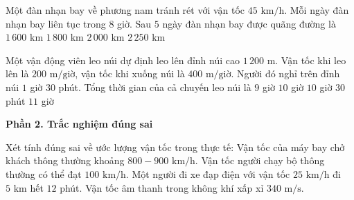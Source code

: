 \begin{ex} %
Một đàn nhạn bay về phương nam tránh rét với vận tốc $45\text{ km/h}$. Mỗi ngày đàn nhạn bay liên tục trong $8$ giờ. Sau $5$ ngày đàn nhạn bay được quãng đường là
\choice
{$1\,600\text{ km}$}
{\True $1\,800\text{ km}$}
{$2\,000\text{ km}$}
{$2\,250\text{ km}$}
\end{ex}

\begin{ex} %
Một vận động viên leo núi dự định leo lên đỉnh núi cao $1\,200\text{ m}$. Vận tốc khi leo lên là $200\text{ m/giờ}$, vận tốc khi xuống núi là $400\text{ m/giờ}$. Người đó nghỉ trên đỉnh núi $1$ giờ $30$ phút. Tổng thời gian của cả chuyến leo núi là
\choice
{$9$ giờ}
{$10$ giờ}
{\True $10$ giờ $30$ phút}
{$11$ giờ}
\end{ex}

\textbf{Phần 2. Trắc nghiệm đúng sai}

\begin{ex} %
Xét tính đúng sai về ước lượng vận tốc trong thực tế:
\choiceTF
{\True Vận tốc của máy bay chở khách thông thường khoảng $800 - 900\text{ km/h}$.}
{Vận tốc người chạy bộ thông thường có thể đạt $100\text{ km/h}$.}
{\True Một người đi xe đạp điện với vận tốc $25\text{ km/h}$ đi $5\text{ km}$ hết $12$ phút.}
{\True Vận tốc âm thanh trong không khí xấp xỉ $340\text{ m/s}$.}
\end{ex}

